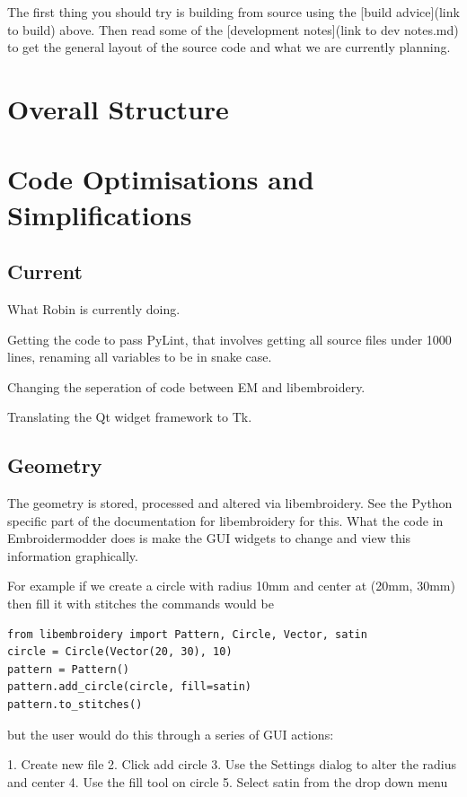 \documentclass[a4paper]{report}
\begin{document}
The first thing you should try is building from source using the [build advice](link to build)
above. Then read some of the [development notes](link to dev notes.md) to get the general
layout of the source code and what we are currently planning.


\section{Overall Structure}

\section{Code Optimisations and Simplifications}

\subsection{Current}

What Robin is currently doing.

Getting the code to pass PyLint, that involves getting all source files
under 1000 lines, renaming all variables to be in snake case.

Changing the seperation of code between EM and libembroidery.

Translating the Qt widget framework to Tk.

\subsection{Geometry}

The geometry is stored, processed and altered via libembroidery. See the Python
specific part of the documentation for libembroidery for this. What the code in
Embroidermodder does is make the GUI widgets to change and view this information
graphically.

For example if we create a circle with radius 10mm and center at (20mm, 30mm)
then fill it with stitches the commands would be

\begin{lstlisting}
from libembroidery import Pattern, Circle, Vector, satin
circle = Circle(Vector(20, 30), 10)
pattern = Pattern()
pattern.add_circle(circle, fill=satin)
pattern.to_stitches()
\end{lstlisting}

but the user would do this through a series of GUI actions:

1. Create new file
2. Click add circle
3. Use the Settings dialog to alter the radius and center
4. Use the fill tool on circle
5. Select satin from the drop down menu
\end{document}
